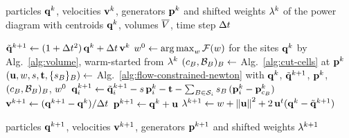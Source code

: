 \documentclass[main.tex]{subfiles}
\begin{document}
\newcommand{\algwrap}[1]{\parbox[t]{0.72\linewidth}{\raggedright #1}}

\begin{algorithm}[H]
  \caption{Time step of the constrained integrator (\S\ref{sec:flow-constrained}).}
  \label{alg:flow-constrained}
  \begin{algorithmic}[1]
    \Require \algwrap{particles $\mathbf{q}^k$, velocities $\mathbf{v}^k$, generators $\mathbf{p}^k$ and shifted weights $\lambda^k$ of the power diagram with centroids $\mathbf{q}^k$, volumes $\overline{V}$, time step $\Delta t$}
    \State $\tilde{\mathbf{q}}^{k+1} \gets (1 + \Delta t^2)\,\mathbf{q}^k + \Delta t\,\mathbf{v}^k$ \Comment{\eqref{eq:flow-shake-step-pred}}
    \State $w^0 \gets \operatorname{arg\,max}_{w} \mathcal{F}(w)$ for the sites $\mathbf{q}^k$ \Comment{\eqref{eq:volume-dual}}
    \Statex \hspace{\algorithmicindent} by Alg.~\ref{alg:volume}, warm-started from $\lambda^k$
    \State $(c_B, \mathcal{B}_B)_B \gets$ Alg.~\ref{alg:cut-cells} at $\mathbf{p}^k$ 
    \State $(\mathbf{u}, w, s, \mathbf{t}, \{s_B\}_B) \gets$ Alg.~\ref{alg:flow-constrained-newton} with $\mathbf{q}^k$, $\tilde{\mathbf{q}}^{k+1}$, $\mathbf{p}^k$, $(c_B, \mathcal{B}_B)_B$, $w^0$
    \State $\mathbf{q}^{k+1}_i \gets \tilde{\mathbf{q}}^{k+1}_i - s\,\mathbf{p}^k_i - \mathbf{t} - \sum_{B \in \mathcal{S}_i} s_B\,(\mathbf{p}^k_i - \mathbf{p}^k_{c_B})$ \Comment{\eqref{eq:flow-shake-step-corr}}
    \State $\mathbf{v}^{k+1} \gets (\mathbf{q}^{k+1} - \mathbf{q}^k) / \Delta t$
    \State $\mathbf{p}^{k+1} \gets \mathbf{q}^k + \mathbf{u}$ \Comment{\eqref{eq:shifted-site-pos}}
    \State $\lambda^{k+1} \gets w + \left\lVert \mathbf{u} \right\rVert^2 + 2\,\mathbf{u}^{t} (\mathbf{q}^k - \tilde{\mathbf{q}}^{k+1})$ \Comment{\eqref{eq:shifted-site-weight}}
    \State \Return \algwrap{particles $\mathbf{q}^{k+1}$, velocities $\mathbf{v}^{k+1}$, generators $\mathbf{p}^{k+1}$ and shifted weights $\lambda^{k+1}$}
  \end{algorithmic}
\end{algorithm}
\end{document}
